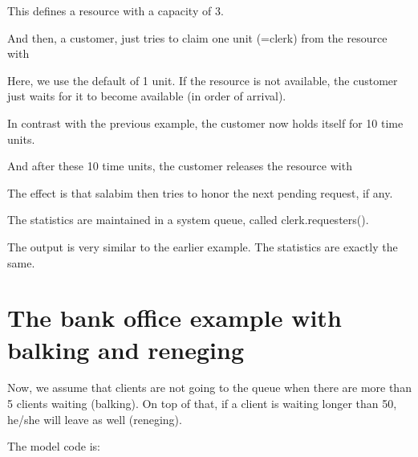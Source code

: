 \documentclass[letterpaper,10pt,english]{sphinxmanual}
\begin{document}
This defines a resource with a capacity of 3.

And then, a customer, just tries to claim one unit (=clerk) from the resource with

\begin{sphinxVerbatim}[commandchars=\\\{\}]
 
\end{sphinxVerbatim}

Here, we use the default of 1 unit. If the resource is not available, the customer just
waits for it to become available (in order of arrival).

In contrast with the previous example, the customer now holds itself for 10 time units.

And after these 10 time units, the customer releases the resource with

\begin{sphinxVerbatim}[commandchars=\\\{\}]
\end{sphinxVerbatim}

The effect is that salabim then tries to honor the next pending request, if any.

The statistics are maintained in a system queue, called clerk.requesters().

The output is very similar to the earlier example. The statistics are exactly the same.


\section{The bank office example with balking and reneging}
\label{\detokenize{Modeling:the-bank-office-example-with-balking-and-reneging}}
Now, we assume that clients are not going to the queue when there are more than 5 clients
waiting (balking). On top of that, if a client is waiting longer than 50, he/she will
leave as well (reneging).

The model code is:
\end{document}
